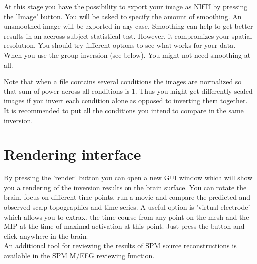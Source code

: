 At this stage you have the possibility to export your image as NIfTI by pressing the 'Image' button. You will be asked to specify the amount of smoothing. An unsmoothed image will
be exported in any case. Smoothing can help to get better results in an accross subject statistical test. However, it compromizes your spatial resolution. You should try different options
to see what works for your data. When you use the group inversion (see below). You might not need smoothing at all. 

Note that when a file contains several conditions the images are normalized so that sum of power across all conditions is 1. Thus you might get differently scaled images if you invert each
condition alone as opposed to inverting them together. It is recommended to put all the conditions you intend to compare in the same inversion. 

\section{Rendering interface}
By pressing the 'render' button you can open a new GUI window which will show you a rendering of the inversion results on the brain surface. You can rotate the brain, focus on different
time points, run a movie and compare the predicted and observed scalp topographies and time series. A useful option is 'virtual electrode' which allows you to extraxt the time course from any
point on the mesh and the MIP at the time of maximal activation at this point. Just press the button and click anywhere in the brain.\\
An additional tool for reviewing the results of SPM source reconstructions is available in the SPM M/EEG reviewing function.

